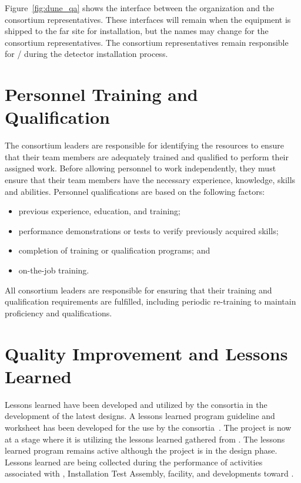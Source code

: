 Figure~\ref{fig:dune_qa} shows the interface between the
  organization and the consortium 
representatives.  These interfaces will remain when the equipment is
shipped to the far site for installation, but the names may change for
the consortium  representatives.  The consortium 
representatives remain responsible for / during the
detector installation process.


\section{Personnel Training and Qualification}

The  consortium leaders are responsible for identifying the
resources to ensure that their team members are adequately trained and
qualified to perform their assigned work. Before allowing personnel to
work independently, they must %
ensure that their team
members have the necessary experience, knowledge, skills and
abilities. Personnel qualifications are based on the following
factors:
\begin{itemize}
 \item previous experience, education, and training;
 \item performance demonstrations or tests to verify previously
   acquired skills;
 \item completion of training or qualification programs; and 
 \item on-the-job training.
\end{itemize}

All  consortium leaders are responsible for ensuring that
their training and qualification requirements are fulfilled, including
periodic re-training to maintain proficiency and qualifications.


\section{Quality Improvement and Lessons Learned}
\label{sec:quality_improvement}

Lessons learned have been developed and utilized by the consortia in
the development of the latest designs.  A lessons learned program
guideline and worksheet has been developed for the use by the
consortia~.  The project is now at a stage where it is
utilizing the lessons learned gathered from . The
lessons learned program remains active although the project is in the
design phase. Lessons learned are being collected during the
performance of activities associated with ,
  Installation Test Assembly, 
\coldbox facility, and developments toward .


